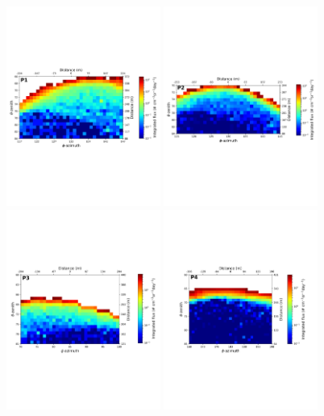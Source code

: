 \documentclass[letterpaper,10pt,titlepage,linenumber]{article}
\begin{document}
\begin{figure}[!ht]
\centering
\includegraphics[width=0.45\textwidth]{Figures/fluxP1}
\includegraphics[width=0.45\textwidth]{Figures/fluxP2}\\
\includegraphics[width=0.45\textwidth]{Figures/fluxP3}
\includegraphics[width=0.45\textwidth]{Figures/fluxP4}

\end{figure}
\end{document}
